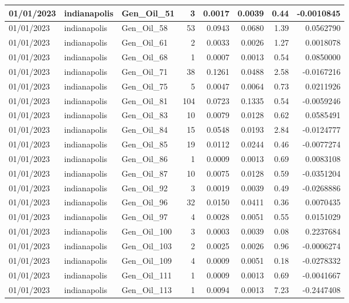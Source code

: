 \documentclass[
  letterpaper,
  DIV=11,
  numbers=noendperiod]{scrartcl}
\begin{document}
\begin{tabular}{l|l|l|r|r|r|r|r}
\hline
01/01/2023 & indianapolis & Gen\_Oil\_51 & 3 & 0.0017 & 0.0039 & 0.44 & -0.0010845\\
\hline
01/01/2023 & indianapolis & Gen\_Oil\_58 & 53 & 0.0943 & 0.0680 & 1.39 & 0.0562790\\
\hline
01/01/2023 & indianapolis & Gen\_Oil\_61 & 2 & 0.0033 & 0.0026 & 1.27 & 0.0018078\\
\hline
01/01/2023 & indianapolis & Gen\_Oil\_68 & 1 & 0.0007 & 0.0013 & 0.54 & 0.0850000\\
\hline
01/01/2023 & indianapolis & Gen\_Oil\_71 & 38 & 0.1261 & 0.0488 & 2.58 & -0.0167216\\
\hline
01/01/2023 & indianapolis & Gen\_Oil\_75 & 5 & 0.0047 & 0.0064 & 0.73 & 0.0211926\\
\hline
01/01/2023 & indianapolis & Gen\_Oil\_81 & 104 & 0.0723 & 0.1335 & 0.54 & -0.0059246\\
\hline
01/01/2023 & indianapolis & Gen\_Oil\_83 & 10 & 0.0079 & 0.0128 & 0.62 & 0.0585491\\
\hline
01/01/2023 & indianapolis & Gen\_Oil\_84 & 15 & 0.0548 & 0.0193 & 2.84 & -0.0124777\\
\hline
01/01/2023 & indianapolis & Gen\_Oil\_85 & 19 & 0.0112 & 0.0244 & 0.46 & -0.0077274\\
\hline
01/01/2023 & indianapolis & Gen\_Oil\_86 & 1 & 0.0009 & 0.0013 & 0.69 & 0.0083108\\
\hline
01/01/2023 & indianapolis & Gen\_Oil\_87 & 10 & 0.0075 & 0.0128 & 0.59 & -0.0351204\\
\hline
01/01/2023 & indianapolis & Gen\_Oil\_92 & 3 & 0.0019 & 0.0039 & 0.49 & -0.0268886\\
\hline
01/01/2023 & indianapolis & Gen\_Oil\_96 & 32 & 0.0150 & 0.0411 & 0.36 & 0.0070435\\
\hline
01/01/2023 & indianapolis & Gen\_Oil\_97 & 4 & 0.0028 & 0.0051 & 0.55 & 0.0151029\\
\hline
01/01/2023 & indianapolis & Gen\_Oil\_100 & 3 & 0.0003 & 0.0039 & 0.08 & 0.2237684\\
\hline
01/01/2023 & indianapolis & Gen\_Oil\_103 & 2 & 0.0025 & 0.0026 & 0.96 & -0.0006274\\
\hline
01/01/2023 & indianapolis & Gen\_Oil\_109 & 4 & 0.0009 & 0.0051 & 0.18 & -0.0278332\\
\hline
01/01/2023 & indianapolis & Gen\_Oil\_111 & 1 & 0.0009 & 0.0013 & 0.69 & -0.0041667\\
\hline
01/01/2023 & indianapolis & Gen\_Oil\_113 & 1 & 0.0094 & 0.0013 & 7.23 & -0.2447408\\

\end{tabular}
\end{document}
